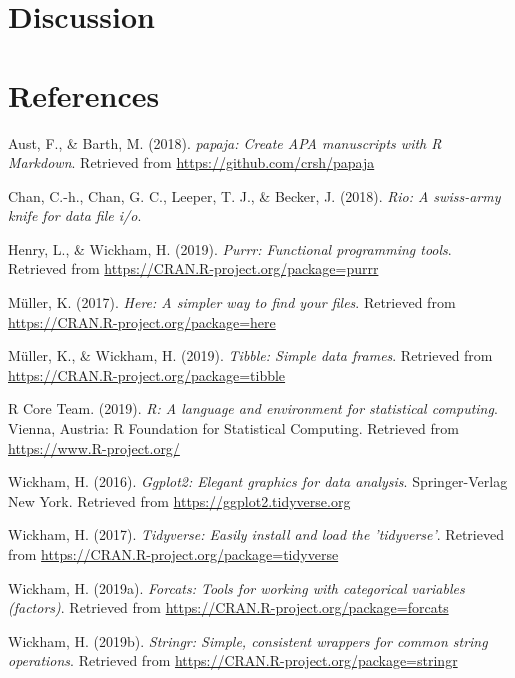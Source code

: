 \documentclass[man,draftall]{apa6}
\begin{document}
\section{Discussion}\label{discussion}

\newpage

\section{References}\label{references}

\begingroup
\setlength{\parindent}{-0.5in} \setlength{\leftskip}{0.5in}

\hypertarget{refs}{}
\hypertarget{ref-R-papaja}{}
Aust, F., \& Barth, M. (2018). \emph{papaja: Create APA manuscripts with
R Markdown}. Retrieved from \url{https://github.com/crsh/papaja}

\hypertarget{ref-R-rio}{}
Chan, C.-h., Chan, G. C., Leeper, T. J., \& Becker, J. (2018).
\emph{Rio: A swiss-army knife for data file i/o}.

\hypertarget{ref-R-purrr}{}
Henry, L., \& Wickham, H. (2019). \emph{Purrr: Functional programming
tools}. Retrieved from \url{https://CRAN.R-project.org/package=purrr}

\hypertarget{ref-R-here}{}
Müller, K. (2017). \emph{Here: A simpler way to find your files}.
Retrieved from \url{https://CRAN.R-project.org/package=here}

\hypertarget{ref-R-tibble}{}
Müller, K., \& Wickham, H. (2019). \emph{Tibble: Simple data frames}.
Retrieved from \url{https://CRAN.R-project.org/package=tibble}

\hypertarget{ref-R-base}{}
R Core Team. (2019). \emph{R: A language and environment for statistical
computing}. Vienna, Austria: R Foundation for Statistical Computing.
Retrieved from \url{https://www.R-project.org/}

\hypertarget{ref-R-ggplot2}{}
Wickham, H. (2016). \emph{Ggplot2: Elegant graphics for data analysis}.
Springer-Verlag New York. Retrieved from
\url{https://ggplot2.tidyverse.org}

\hypertarget{ref-R-tidyverse}{}
Wickham, H. (2017). \emph{Tidyverse: Easily install and load the
'tidyverse'}. Retrieved from
\url{https://CRAN.R-project.org/package=tidyverse}

\hypertarget{ref-R-forcats}{}
Wickham, H. (2019a). \emph{Forcats: Tools for working with categorical
variables (factors)}. Retrieved from
\url{https://CRAN.R-project.org/package=forcats}

\hypertarget{ref-R-stringr}{}
Wickham, H. (2019b). \emph{Stringr: Simple, consistent wrappers for
common string operations}. Retrieved from
\url{https://CRAN.R-project.org/package=stringr}
\end{document}
